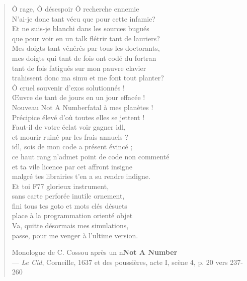 \cleardoublepage
\begin{quote}
\og Ô rage, Ô désespoir Ô recherche ennemie\\
N'ai-je donc tant vécu que pour cette infamie?\\
Et ne suis-je blanchi dans les sources bugués\\
que pour voir en un talk flétrir tant de lauriers? \\
Mes doigts tant vénérés par tous les doctorants, \\
mes doigts qui tant de fois ont codé du fortran\\
tant de fois fatigués sur mon pauvre clavier\\
trahissent donc ma simu et me font tout planter? \\
Ô cruel souvenir d'exos solutionnés !\\
Œuvre de tant de jours en un jour effacée !\\
Nouveau \og Not A Number\fg fatal à mes planètes !\\
Précipice élevé d'où toutes elles se jettent !\\
Faut-il de votre éclat voir gagner idl, \\
et mourir ruiné par les frais annuels ? \\
idl, sois de mon code a présent évincé ; \\
ce haut rang n'admet point de code non commenté\\
et ta vile licence par cet affront insigne\\
malgré tes librairies t'en a su rendre indigne. \\
Et toi F77 glorieux instrument, \\
sans carte perforée inutile ornement, \\
fini tous tes goto et mots clés désuets\\
place à la programmation orienté objet\\
Va, quitte désormais mes simulations,\\
passe, pour me venger à l'ultime version.\fg

Monologue de C. Cossou après un n\ieme \textbf{Not A Number}\\
  --- \textit{Le Cid}, Corneille, 1637 et des poussières, acte I, scène 4, p. 20 vers 237-260
\end{quote}
